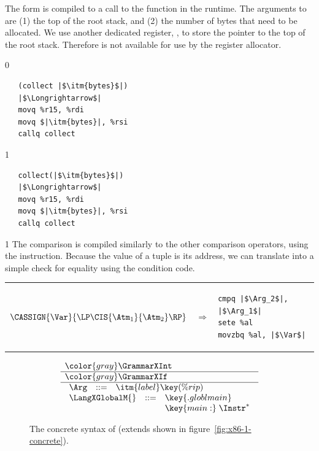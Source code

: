 \documentclass[7x10]{TimesAPriori_MIT}%
\newcommand{\gray}[1]{{\color{gray} #1}}
\def\racketEd{0}
\def\pythonEd{1}
\def\edition{1}
\newcommand{\pythonColor}[0]{}
\numberwithin{theorem}{chapter}
\numberwithin{definition}{chapter}
\numberwithin{equation}{chapter}
\begin{document}
%
The  form is compiled to a call to the 
function in the runtime. The arguments to  are (1) the
top of the root stack, and (2) the number of bytes that need to be
allocated.  We use another dedicated register, , to store
the pointer to the top of the root stack. Therefore  is not
available for use by the register allocator.
%
{\if\edition\racketEd
\begin{lstlisting}
   (collect |$\itm{bytes}$|)
   |$\Longrightarrow$|
   movq %r15, %rdi
   movq $|\itm{bytes}|, %rsi
   callq collect
\end{lstlisting}
\fi}
{\if\edition\pythonEd\pythonColor    
\begin{lstlisting}
   collect(|$\itm{bytes}$|)
   |$\Longrightarrow$|
   movq %r15, %rdi
   movq $|\itm{bytes}|, %rsi
   callq collect
\end{lstlisting}
\fi}

{\if\edition\pythonEd\pythonColor    
The  comparison is compiled similarly to the other comparison
operators, using the  instruction. Because the value of a
tuple is its address, we can translate  into a simple check
for equality using the  condition code. \\
\begin{tabular}{lll}
\begin{minipage}{0.4\textwidth}
$\CASSIGN{\Var}{ \LP\CIS{\Atm_1}{\Atm_2} \RP }$ 
\end{minipage}
&
$\Rightarrow$
&
\begin{minipage}{0.4\textwidth}
\begin{lstlisting}
cmpq |$\Arg_2$|, |$\Arg_1$|
sete %al
movzbq %al, |$\Var$|
\end{lstlisting}
\end{minipage}
\end{tabular}
\fi}


\newcommand{\GrammarXGlobal}{
\begin{array}{lcl}
  \Arg &::=& \itm{label} \key{(\%rip)} 
\end{array}
}

\newcommand{\ASTXGlobalRacket}{
\begin{array}{lcl}
  \Arg &::=&  \GLOBAL{\itm{label}} 
\end{array}
}


\begin{figure}[tp]
  \begin{tcolorbox}[colback=white]
\[
\begin{array}{l}
  \gray{\GrammarXInt} \\ \hline
  \gray{\GrammarXIf} \\ \hline
  \GrammarXGlobal \\
\begin{array}{lcl}
\LangXGlobalM{} &::= &  \key{.globl main} \\
      &    &  \key{main:} \; \Instr^{*} 
\end{array}
\end{array}
\]
  \end{tcolorbox}
\caption{The concrete syntax of \LangXGlobal{}  (extends \LangXIf{} shown in figure~\ref{fig:x86-1-concrete}).}
\label{fig:x86-2-concrete}
\end{figure}
\end{document}
